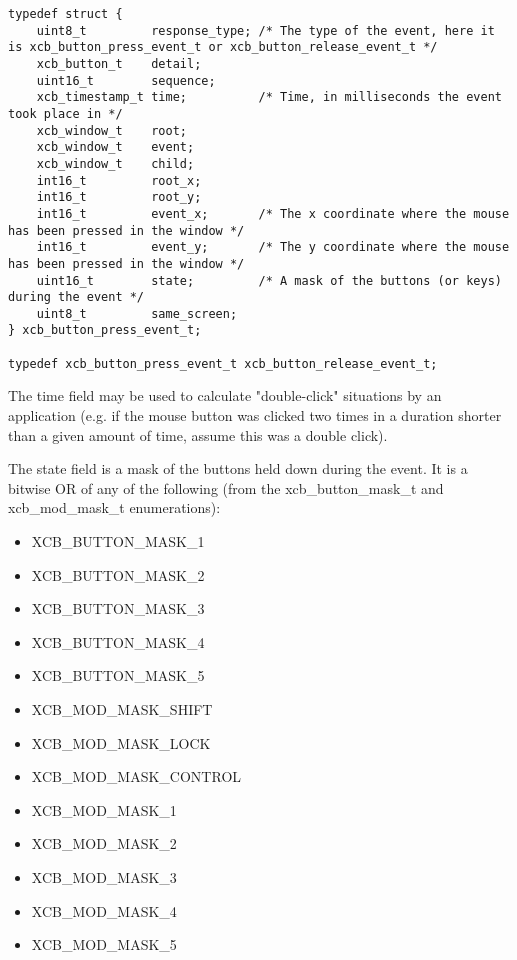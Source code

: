 \documentclass[12pt,oneside,titlepage]{book}
\providecommand{\tightlist}{%
  \setlength{\itemsep}{0pt}\setlength{\parskip}{0pt}}
\begin{document}
\begin{enumerate}
\begin{enumerate}
\begin{enumerate}
\begin{verbatim}
typedef struct {
    uint8_t         response_type; /* The type of the event, here it is xcb_button_press_event_t or xcb_button_release_event_t */
    xcb_button_t    detail;
    uint16_t        sequence;
    xcb_timestamp_t time;          /* Time, in milliseconds the event took place in */
    xcb_window_t    root;
    xcb_window_t    event;
    xcb_window_t    child;
    int16_t         root_x;
    int16_t         root_y;
    int16_t         event_x;       /* The x coordinate where the mouse has been pressed in the window */
    int16_t         event_y;       /* The y coordinate where the mouse has been pressed in the window */
    uint16_t        state;         /* A mask of the buttons (or keys) during the event */
    uint8_t         same_screen;
} xcb_button_press_event_t;

typedef xcb_button_press_event_t xcb_button_release_event_t;
\end{verbatim}

      The {time} field may be used to calculate "double-click"
      situations by an application (e.g. if the mouse button was clicked
      two times in a duration shorter than a given amount of time,
      assume this was a double click).

      The {state} field is a mask of the buttons held down during the
      event. It is a bitwise OR of any of the following (from the
      xcb\_button\_mask\_t and xcb\_mod\_mask\_t enumerations):

      \begin{itemize}
      \tightlist
      \item
        {XCB\_BUTTON\_MASK\_1}
      \item
        {XCB\_BUTTON\_MASK\_2}
      \item
        {XCB\_BUTTON\_MASK\_3}
      \item
        {XCB\_BUTTON\_MASK\_4}
      \item
        {XCB\_BUTTON\_MASK\_5}
      \item
        {XCB\_MOD\_MASK\_SHIFT}
      \item
        {XCB\_MOD\_MASK\_LOCK}
      \item
        {XCB\_MOD\_MASK\_CONTROL}
      \item
        {XCB\_MOD\_MASK\_1}
      \item
        {XCB\_MOD\_MASK\_2}
      \item
        {XCB\_MOD\_MASK\_3}
      \item
        {XCB\_MOD\_MASK\_4}
      \item
        {XCB\_MOD\_MASK\_5}
      \end{itemize}


\end{enumerate}
\end{enumerate}
\end{enumerate}
\end{document}
